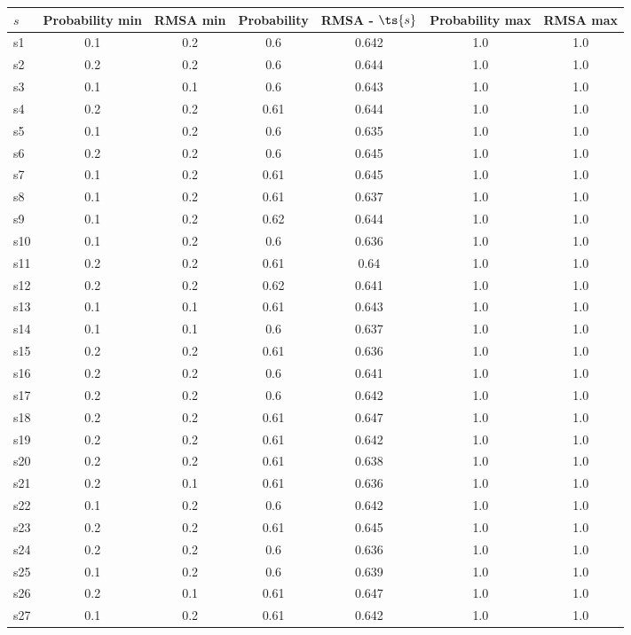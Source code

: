 \documentclass{article}
\begin{document}
\noindent\begin{tabular}{|l|c|c|c|c|c|c|}
\hline
$s$& Probability min & RMSA min & Probability & RMSA - $\ts{s}$ & Probability max & RMSA max\\
\hline
s1 &0.1 & 0.2 & 0.6 & 0.642 & 1.0 & 1.0\\
\hline
s2 &0.2 & 0.2 & 0.6 & 0.644 & 1.0 & 1.0\\
\hline
s3 &0.1 & 0.1 & 0.6 & 0.643 & 1.0 & 1.0\\
\hline
s4 &0.2 & 0.2 & 0.61 & 0.644 & 1.0 & 1.0\\
\hline
s5 &0.1 & 0.2 & 0.6 & 0.635 & 1.0 & 1.0\\
\hline
s6 &0.2 & 0.2 & 0.6 & 0.645 & 1.0 & 1.0\\
\hline
s7 &0.1 & 0.2 & 0.61 & 0.645 & 1.0 & 1.0\\
\hline
s8 &0.1 & 0.2 & 0.61 & 0.637 & 1.0 & 1.0\\
\hline
s9 &0.1 & 0.2 & 0.62 & 0.644 & 1.0 & 1.0\\
\hline
s10 &0.1 & 0.2 & 0.6 & 0.636 & 1.0 & 1.0\\
\hline
s11 &0.2 & 0.2 & 0.61 & 0.64 & 1.0 & 1.0\\
\hline
s12 &0.2 & 0.2 & 0.62 & 0.641 & 1.0 & 1.0\\
\hline
s13 &0.1 & 0.1 & 0.61 & 0.643 & 1.0 & 1.0\\
\hline
s14 &0.1 & 0.1 & 0.6 & 0.637 & 1.0 & 1.0\\
\hline
s15 &0.2 & 0.2 & 0.61 & 0.636 & 1.0 & 1.0\\
\hline
s16 &0.2 & 0.2 & 0.6 & 0.641 & 1.0 & 1.0\\
\hline
s17 &0.2 & 0.2 & 0.6 & 0.642 & 1.0 & 1.0\\
\hline
s18 &0.2 & 0.2 & 0.61 & 0.647 & 1.0 & 1.0\\
\hline
s19 &0.2 & 0.2 & 0.61 & 0.642 & 1.0 & 1.0\\
\hline
s20 &0.2 & 0.2 & 0.61 & 0.638 & 1.0 & 1.0\\
\hline
s21 &0.2 & 0.1 & 0.61 & 0.636 & 1.0 & 1.0\\
\hline
s22 &0.1 & 0.2 & 0.6 & 0.642 & 1.0 & 1.0\\
\hline
s23 &0.2 & 0.2 & 0.61 & 0.645 & 1.0 & 1.0\\
\hline
s24 &0.2 & 0.2 & 0.6 & 0.636 & 1.0 & 1.0\\
\hline
s25 &0.1 & 0.2 & 0.6 & 0.639 & 1.0 & 1.0\\
\hline
s26 &0.2 & 0.1 & 0.61 & 0.647 & 1.0 & 1.0\\
\hline
s27 &0.1 & 0.2 & 0.61 & 0.642 & 1.0 & 1.0\\

\end{tabular}
\end{document}

